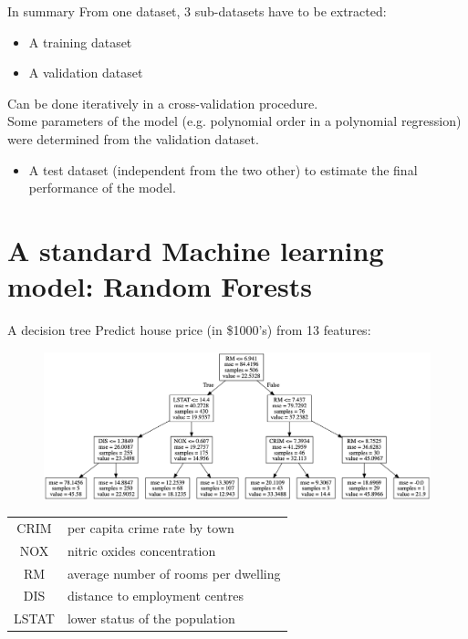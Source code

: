 \documentclass[handout]{beamer}
\begin{document}
\begin{frame}{In summary}
    From one dataset, 3 sub-datasets have to be extracted:
    \begin{itemize}
        \item A training dataset
        \item A validation dataset
    \end{itemize}
    Can be done iteratively in a cross-validation procedure.\\
    \alert {Some parameters of the model (e.g. polynomial order in a polynomial regression) were determined from the validation dataset.}
    \begin{itemize}
        \item A test dataset (independent from the two other) to estimate the final performance of the model.
    \end{itemize}
\end{frame}

\section{A standard Machine learning model: Random Forests}

\begin{frame}{A decision tree}
    Predict house price (in \$1000's) from 13 features:
    \begin{figure}
        \centering
        \includegraphics[width=.9\textwidth]{fig/L2/tree.png}
    \end{figure}
        
    \begin{table}
    \centering
    \begin{tabular}{c|l}
       CRIM   &  per capita crime rate by town \\   
       NOX    &  nitric oxides concentration  \\
       RM     &  average number of rooms per dwelling \\
       DIS    &  distance to employment centres \\
       LSTAT  &  lower status of the population \\
         
        \end{tabular}
        \end{table}

\end{frame}
\end{document}
